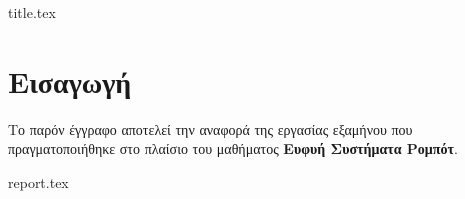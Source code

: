 \documentclass{article}
\begin{document}
{title.tex}

\tableofcontents

    

\section{Εισαγωγή}

Το παρόν έγγραφο αποτελεί την αναφορά της εργασίας εξαμήνου που πραγματοποιήθηκε στο πλαίσιο του μαθήματος \textbf{Ευφυή Συστήματα Ρομπότ}. 

{report.tex}
\clearpage



\clearpage

\end{document}
